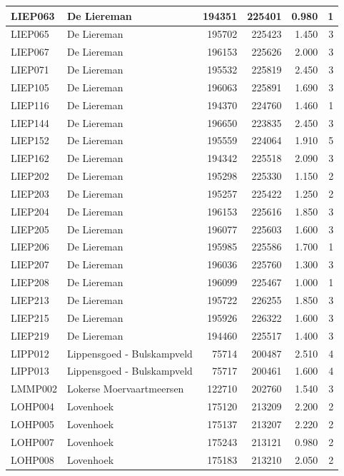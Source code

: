 \documentclass[11pt,]{book}
\begin{document}
\begin{table}
\begin{tabular}[t]{l|l|r|r|r|r}
\hline
LIEP063 & De Liereman & 194351 & 225401 & 0.980 & 1\\
\hline
LIEP065 & De Liereman & 195702 & 225423 & 1.450 & 3\\
\hline
LIEP067 & De Liereman & 196153 & 225626 & 2.000 & 3\\
\hline
LIEP071 & De Liereman & 195532 & 225819 & 2.450 & 3\\
\hline
LIEP105 & De Liereman & 196063 & 225891 & 1.690 & 3\\
\hline
LIEP116 & De Liereman & 194370 & 224760 & 1.460 & 1\\
\hline
LIEP144 & De Liereman & 196650 & 223835 & 2.450 & 3\\
\hline
LIEP152 & De Liereman & 195559 & 224064 & 1.910 & 5\\
\hline
LIEP162 & De Liereman & 194342 & 225518 & 2.090 & 3\\
\hline
LIEP202 & De Liereman & 195298 & 225330 & 1.150 & 2\\
\hline
LIEP203 & De Liereman & 195257 & 225422 & 1.250 & 2\\
\hline
LIEP204 & De Liereman & 196153 & 225616 & 1.850 & 3\\
\hline
LIEP205 & De Liereman & 196077 & 225603 & 1.600 & 3\\
\hline
LIEP206 & De Liereman & 195985 & 225586 & 1.700 & 1\\
\hline
LIEP207 & De Liereman & 196036 & 225760 & 1.300 & 3\\
\hline
LIEP208 & De Liereman & 196099 & 225467 & 1.000 & 1\\
\hline
LIEP213 & De Liereman & 195722 & 226255 & 1.850 & 3\\
\hline
LIEP215 & De Liereman & 195926 & 226322 & 1.600 & 3\\
\hline
LIEP219 & De Liereman & 194460 & 225517 & 1.400 & 3\\
\hline
LIPP012 & Lippensgoed - Bulskampveld & 75714 & 200487 & 2.510 & 4\\
\hline
LIPP013 & Lippensgoed - Bulskampveld & 75717 & 200461 & 1.600 & 4\\
\hline
LMMP002 & Lokerse Moervaartmeersen & 122710 & 202760 & 1.540 & 3\\
\hline
LOHP004 & Lovenhoek & 175120 & 213209 & 2.200 & 2\\
\hline
LOHP005 & Lovenhoek & 175137 & 213207 & 2.220 & 2\\
\hline
LOHP007 & Lovenhoek & 175243 & 213121 & 0.980 & 2\\
\hline
LOHP008 & Lovenhoek & 175183 & 213210 & 2.050 & 2\\

\end{tabular}
\end{table}
\end{document}
